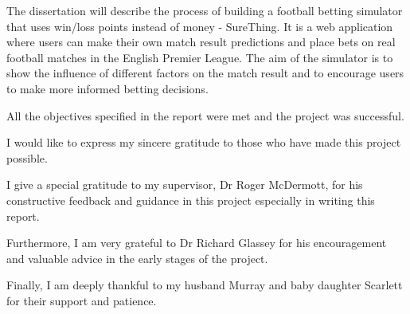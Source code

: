 \beforeabstract
{}
The dissertation will describe the process of building a football betting simulator that uses win/loss points instead of money - SureThing. It is a web application where users can make their own match result predictions and place bets on real football matches in the English Premier League. The aim of the simulator is to show the influence of different factors on the match result and to encourage users to make more informed betting decisions.

All the objectives specified in the report were met and the project was successful.

I would like to express my sincere gratitude to those who have made this project possible. 

 I give a special gratitude to my supervisor, Dr Roger McDermott, for his constructive feedback and guidance in this project especially in writing this report. 

Furthermore, I am very grateful to Dr Richard Glassey for his encouragement and valuable advice in the early stages of the project.

Finally, I am deeply thankful to my husband Murray and baby daughter Scarlett for their support and patience.

\afterpreface
\afterabstract
